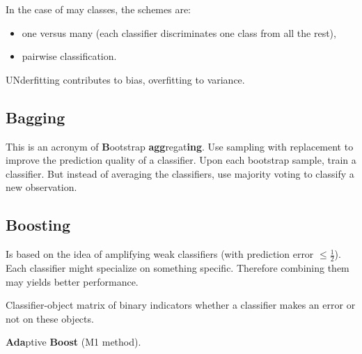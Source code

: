 \documentclass[a4paper]{article}
\begin{document}
In the case of may classes, the schemes are:
\begin{itemize}
	\item one versus many (each classifier discriminates one class from all the rest),
	\item pairwise classification.
\end{itemize}

UNderfitting contributes to bias, overfitting to variance.

\subsection{Bagging} %
\label{sub:bagging}

This is an acronym of \textbf{B}ootstrap \textbf{agg}regat\textbf{ing}.
Use sampling with replacement to improve the prediction quality of a classifier.
Upon each bootstrap sample, train a classifier. But instead of averaging the classifiers,
use majority voting to classify a new observation. 


\subsection{Boosting} %
\label{sub:boosting}

Is based on the idea of amplifying weak classifiers (with prediction error $\leq\frac{1}{2}$).
Each classifier might specialize on something specific. Therefore combining them may yields better performance.

Classifier-object matrix of binary indicators whether a classifier makes an error or not on these objects.

\textbf{Ada}ptive \textbf{Boost} (M1 method).



\end{document}
